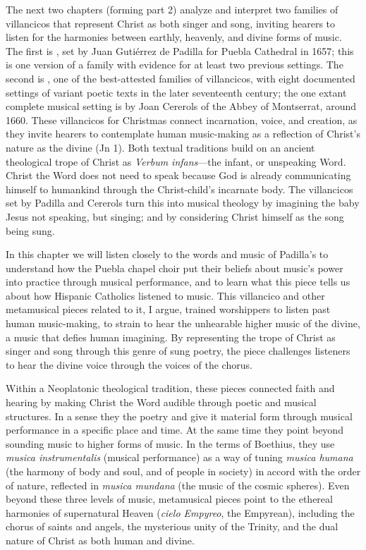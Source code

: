 The next two chapters (forming part 2) analyze and interpret two families of
villancicos that represent Christ as both singer and song, inviting hearers to
listen for the harmonies between earthly, heavenly, and divine forms of music.
The first is , set by Juan Gutiérrez de Padilla
for Puebla Cathedral in 1657; this is one version of a family with evidence for
at least two previous settings.
The second is , one of the
best-attested families of villancicos, with eight documented settings of variant
poetic texts in the later seventeenth century; the one extant complete musical
setting is by Joan Cererols of the Abbey of Montserrat, around 1660.
These villancicos for Christmas connect incarnation, voice, and creation, as
they invite hearers to contemplate human music-making as a reflection of
Christ's nature as the divine  (Jn 1).
Both textual traditions build on an ancient theological trope of Christ as
\emph{Verbum infans}---the infant, or unspeaking Word.
Christ the Word does not need to speak because God is already communicating
himself to humankind through the Christ-child's incarnate body.
The villancicos set by Padilla and Cererols turn this into musical theology by
imagining the baby Jesus not speaking, but singing; and by considering Christ
himself as the song being sung.

In this chapter we will listen closely to the words and music of Padilla's
 to understand how the Puebla chapel choir put
their beliefs about music's power into practice through musical performance, and
to learn what this piece tells us about how Hispanic Catholics listened to
music.
This villancico and other metamusical pieces related to it, I argue, trained
worshippers to listen past human music-making, to strain to hear the unhearable
higher music of the divine, a music that defies human imagining.
By representing the trope of Christ as singer and song through this genre of
sung poetry, the piece challenges listeners to hear the divine voice through the
voices of the chorus.

Within a Neoplatonic theological tradition, these pieces connected faith and
hearing by making Christ the Word audible through poetic and musical structures.
In a sense they  the poetry and give it material form through
musical performance in a specific place and time.
At the same time they point beyond sounding music to higher forms of music.
In the terms of Boethius, they use \emph{musica instrumentalis} (musical
performance) as a way of tuning \emph{musica humana} (the harmony of body and
soul, and of people in society) in accord with the order of nature, reflected in
\emph{musica mundana} (the music of the cosmic spheres).%
    \Autocite{Boethius:Musica}
Even beyond these three levels of music, metamusical pieces point to the
ethereal harmonies of supernatural Heaven (\emph{cielo Empyreo}, the Empyrean),
including the chorus of saints and angels, the mysterious unity of the Trinity,
and the dual nature of Christ as both human and divine.

